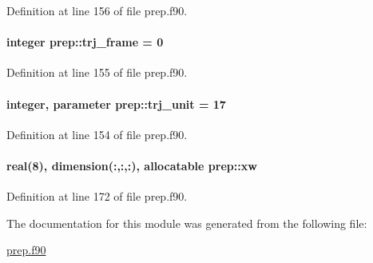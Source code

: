 Definition at line 156 of file prep.\-f90.

\hypertarget{classprep_a67234152a914abc499cb54855d5005ce}{
\paragraph[{trj\-\_\-frame}]{\setlength{\rightskip}{0pt plus 5cm}integer prep\-::trj\-\_\-frame = 0}}\label{classprep_a67234152a914abc499cb54855d5005ce}


Definition at line 155 of file prep.\-f90.

\hypertarget{classprep_a2a8286c4c7bbbdf7837514adf40f56e8}{
\paragraph[{trj\-\_\-unit}]{\setlength{\rightskip}{0pt plus 5cm}integer, parameter prep\-::trj\-\_\-unit = 17}}\label{classprep_a2a8286c4c7bbbdf7837514adf40f56e8}


Definition at line 154 of file prep.\-f90.

\hypertarget{classprep_aa9c1e662e10b97582fdefac8e317ab53}{
\paragraph[{xw}]{\setlength{\rightskip}{0pt plus 5cm}real(8), dimension(\-:,\-:,\-:), allocatable prep\-::xw}}\label{classprep_aa9c1e662e10b97582fdefac8e317ab53}


Definition at line 172 of file prep.\-f90.



The documentation for this module was generated from the following file\-:\begin{DoxyCompactItemize}
\item 
\hyperlink{prep_8f90}{prep.\-f90}\end{DoxyCompactItemize}
